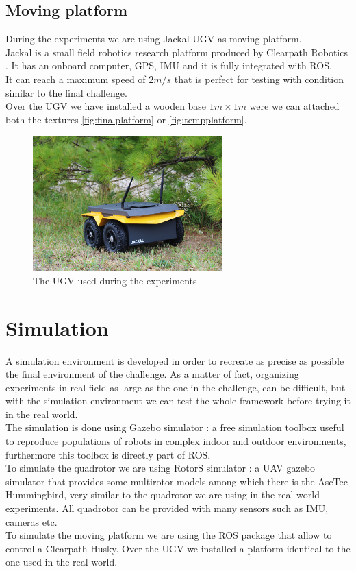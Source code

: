 \subsection{Moving platform}
During the experiments we are using Jackal UGV as moving platform.\\ 
Jackal is a small field robotics research platform produced by Clearpath Robotics \cite{clearpathrobotics}. It has an onboard computer, GPS, IMU and it is fully integrated with ROS.\\
It can reach a maximum speed of $2m/s$ that is perfect for testing with condition similar to the final challenge.\\
Over the UGV we have installed a wooden base $1m \times 1m$ were we can attached both the textures     \ref{fig:finalplatform} or \ref{fig:tempplatform}.
\begin{figure}[!ht]
    \centering
    \includegraphics[width=0.65\textwidth]{img/jackal.jpg}
    \caption{The UGV used during the experiments}
    \label{fig:quad_hardware}
\end{figure}

\section{Simulation}
A simulation environment is developed in order to recreate as precise as possible the final environment of the challenge.  As a matter of fact, organizing experiments in real field as large as the one in the challenge, can be difficult, but with the simulation environment we can test the whole framework before trying it in the real world.\\

The simulation is done using Gazebo simulator \cite{gazebosimulator}: a free simulation toolbox useful to reproduce populations of robots in complex indoor and outdoor environments, furthermore this toolbox is directly part of ROS.\\
To simulate the quadrotor we are using RotorS simulator \cite{rotors2016}: a UAV gazebo simulator that provides some multirotor models among which there is the AscTec Hummingbird, very similar to the quadrotor we are using in the real world experiments. All quadrotor can be provided with many sensors such as IMU, cameras etc. \\
To simulate the moving platform we are using the ROS package \cite{RobotsHusky} that allow to control a Clearpath Husky. Over the UGV we installed a platform identical to the one used in the real world.\\

